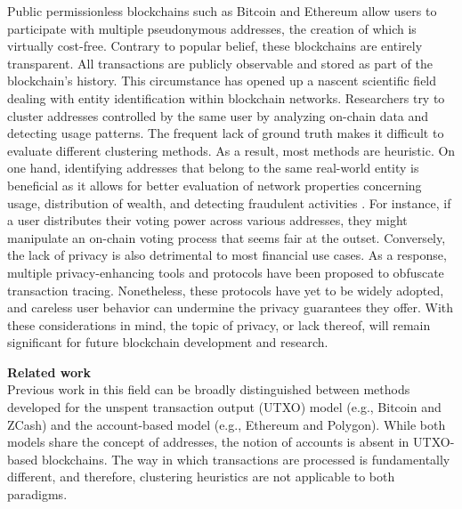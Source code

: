 \documentclass[12pt,a4paper,titlepage,oneside,english]{article}
\begin{document}
Public permissionless blockchains such as Bitcoin \citep{nakamotoBitcoin2008} and Ethereum \citep{buterin2014ethereum} allow users %
 to participate with multiple pseudonymous addresses, the creation of which is virtually cost-free. Contrary to popular belief, these blockchains are entirely transparent. All transactions are publicly observable and stored as part of the blockchain's history.
This circumstance has opened up a nascent scientific field dealing with entity identification within blockchain networks. Researchers try to cluster addresses controlled by the same user by analyzing on-chain data and detecting usage patterns. The frequent lack of ground truth makes it difficult to evaluate different clustering methods. As a result, most methods are heuristic. %
\newline On one hand, identifying addresses that belong to the same real-world entity is beneficial as it allows for better evaluation of network properties concerning usage, distribution of wealth, and detecting fraudulent activities \citep{FV:17}. For instance, if a user distributes their voting power across various addresses, they might manipulate an on-chain voting process that seems fair at the outset. \newline
Conversely, the lack of privacy is also detrimental to most financial use cases. As a response, multiple privacy-enhancing tools and protocols have been proposed to obfuscate transaction tracing. 
Nonetheless, these protocols have yet to be widely adopted, and careless user behavior can undermine the privacy guarantees they offer. \newline
With these considerations in mind, the topic of privacy, or lack thereof, will remain significant for future blockchain development and research.


\textbf{Related work}\\
Previous work in this field can be broadly distinguished between methods developed for the unspent transaction output (UTXO) model (e.g., Bitcoin and ZCash) and the account-based model (e.g., Ethereum and Polygon). While both models share the concept of addresses, the notion of accounts is absent in UTXO-based blockchains. The way in which transactions are processed is fundamentally different, and therefore, clustering heuristics are not applicable to both paradigms.
\end{document}
